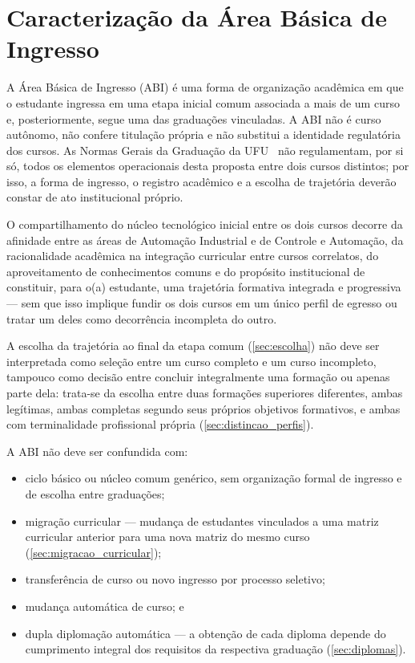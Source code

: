 \section{Caracterização da Área Básica de Ingresso}

A Área Básica de Ingresso (ABI) é uma forma de organização acadêmica em que o estudante ingressa em uma etapa inicial comum associada a mais de um curso e, posteriormente, segue uma das graduações vinculadas. A ABI não é curso autônomo, não confere titulação própria e não substitui a identidade regulatória dos cursos. As Normas Gerais da Graduação da UFU~\cite{ufu_congrad_46_2022} não regulamentam, por si só, todos os elementos operacionais desta proposta entre dois cursos distintos; por isso, a forma de ingresso, o registro acadêmico e a escolha de trajetória deverão constar de ato institucional próprio.

O compartilhamento do núcleo tecnológico inicial entre os dois cursos decorre da afinidade entre as áreas de Automação Industrial e de Controle e Automação, da racionalidade acadêmica na integração curricular entre cursos correlatos, do aproveitamento de conhecimentos comuns e do propósito institucional de constituir, para o(a) estudante, uma trajetória formativa integrada e progressiva — sem que isso implique fundir os dois cursos em um único perfil de egresso ou tratar um deles como decorrência incompleta do outro.

A escolha da trajetória ao final da etapa comum (\autoref{sec:escolha}) não deve ser interpretada como seleção entre um curso completo e um curso incompleto, tampouco como decisão entre concluir integralmente uma formação ou apenas parte dela: trata-se da escolha entre duas formações superiores diferentes, ambas legítimas, ambas completas segundo seus próprios objetivos formativos, e ambas com terminalidade profissional própria (\autoref{sec:distincao_perfis}).

A ABI não deve ser confundida com:

\begin{itemize}
    \item ciclo básico ou núcleo comum genérico, sem organização formal de ingresso e de escolha entre graduações;
    \item migração curricular — mudança de estudantes vinculados a uma matriz curricular anterior para uma nova matriz do mesmo curso (\autoref{sec:migracao_curricular});
    \item transferência de curso ou novo ingresso por processo seletivo;
    \item mudança automática de curso; e
    \item dupla diplomação automática — a obtenção de cada diploma depende do cumprimento integral dos requisitos da respectiva graduação (\autoref{sec:diplomas}).
\end{itemize}

